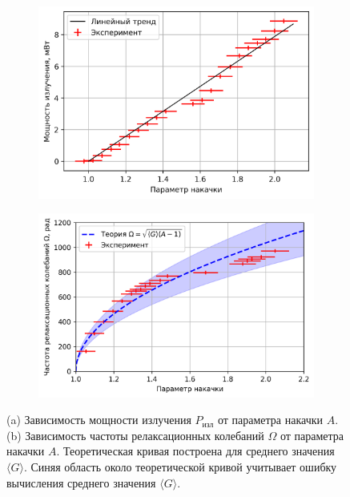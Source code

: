 \documentclass[12pt]{article}
\begin{document}
	\begin{figure} 
    	\centering
    	\begin{subfigure}[t]{0.49\textwidth}
        	\centering
			\includegraphics[width=\textwidth]{../figures/p_iz_vs_A.png}
			\caption{}
			\label{fig:p_iz_vs_A}
    	\end{subfigure}
    	\hfill
    	\begin{subfigure}[t]{0.49\textwidth}
        	\centering
			\includegraphics[width=\textwidth]{../figures/Omega_vs_A.png}
			\caption{}
			\label{fig:Omega_vs_A}
     	\end{subfigure}
     	\caption{(a) Зависимость мощности излучения $P_\text{изл}$ от параметра накачки $A$. (b) Зависимость частоты релаксационных колебаний $\Omega$ от параметра накачки $A$. Теоретическая кривая построена для среднего значения $\langle G \rangle$. Синяя область около теоретической кривой учитывает ошибку вычисления среднего значения $\langle G \rangle$.}
	\end{figure}
\end{document}
